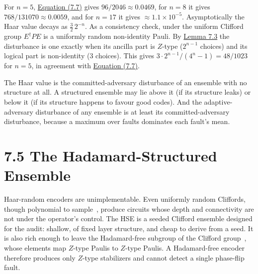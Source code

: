 \documentclass{report}
\theoremstyle{plain}
\theoremstyle{definition}
\theoremstyle{remark}
\begin{document}
For $n=5$, \hyperref[eq:qec:haar]{Equation (7.7)} gives $96/2046\approx 0.0469$, for $n=8$ it gives $768/131070\approx 0.0059$, and for $n=17$ it gives $\approx 1.1\times 10^{-5}$. Asymptotically the Haar value decays as $\tfrac{3}{2}\,2^{-n}$. As a consistency check, under the uniform Clifford group $E^{\dagger}PE$ is a uniformly random non-identity Pauli. By \hyperref[lem:qec:indicator]{Lemma 7.3} the disturbance is one exactly when its ancilla part is $Z$-type ($2^{n-1}$ choices) and its logical part is non-identity ($3$ choices). This gives $3\cdot 2^{n-1}/(4^{n}-1)=48/1023$ for $n=5$, in agreement with \hyperref[eq:qec:haar]{Equation (7.7)}.

The Haar value is the committed-adversary disturbance of an ensemble with no structure at all. A structured ensemble may lie above it (if its structure leaks) or below it (if its structure happens to favour good codes). And the adaptive-adversary disturbance of any ensemble is at least its committed-adversary disturbance, because a maximum over faults dominates each fault's mean.

\section{7.5 The Hadamard-Structured Ensemble}\label{sec:qec:hse}

Haar-random encoders are unimplementable. Even uniformly random Cliffords, though polynomial to sample~\cite{koenig2014clifford}, produce circuits whose depth and connectivity are not under the operator's control. The HSE is a seeded Clifford ensemble designed for the audit: shallow, of fixed layer structure, and cheap to derive from a seed. It is also rich enough to leave the Hadamard-free subgroup of the Clifford group~\cite{bravyi2021hadamardfree}, whose elements map $Z$-type Paulis to $Z$-type Paulis. A Hadamard-free encoder therefore produces only $Z$-type stabilizers and cannot detect a single phase-flip fault.
\end{document}
